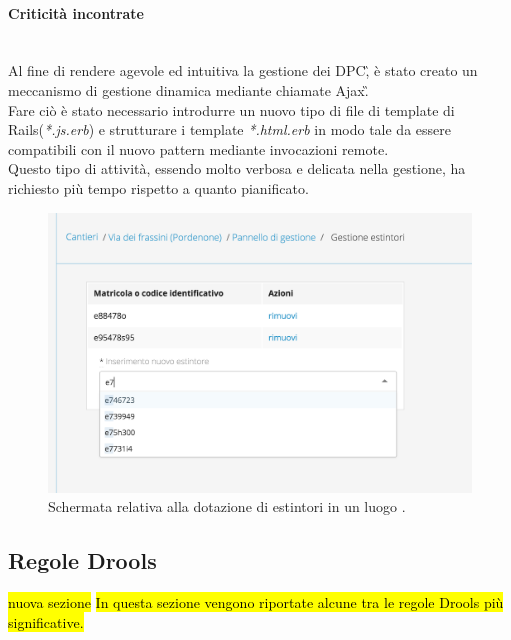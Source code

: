 	\paragraph*{Criticità incontrate}\mbox{}\\
	Al fine di rendere agevole ed intuitiva la gestione dei \gls{DPC}\G, è stato creato un meccanismo di gestione dinamica mediante chiamate \gls{Ajax}\G. \\
	Fare ciò è stato necessario introdurre un nuovo tipo di file di template di Rails(\textit{*.js.erb}) e strutturare i template \textit{*.html.erb} in modo tale da essere compatibili con il nuovo pattern mediante invocazioni remote.\\
	Questo tipo di attività, essendo molto verbosa e delicata nella gestione, ha richiesto più tempo rispetto a quanto pianificato.
		\begin{figure}[H]
			\begin{center}
				\includegraphics[width=12cm]{Pics/ScreenRemoteTrueEstintori.png}
				\caption{Schermata relativa alla dotazione di estintori in un luogo .}
				\label{fig:ScreenRemoteTrueEstintori}
			\end{center}
		\end{figure}
		

\newpage
\subsection{Regole Drools}
\hl{nuova sezione}
\label{Drools:regole}
\hl{In questa sezione vengono riportate alcune tra le regole Drools più significative.}
